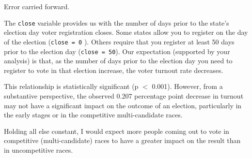 \documentclass[
  letterpaper,
  DIV=11,
  numbers=noendperiod]{scrartcl}
\begin{document}
\begin{tcolorbox}[enhanced jigsaw, titlerule=0mm, colframe=quarto-callout-note-color-frame, rightrule=.15mm, coltitle=black, leftrule=.75mm, breakable, colback=white, toprule=.15mm, left=2mm, bottomrule=.15mm, colbacktitle=quarto-callout-note-color!10!white, opacityback=0, arc=.35mm, bottomtitle=1mm, opacitybacktitle=0.6, title=\textcolor{quarto-callout-note-color}{\faInfo}\hspace{0.5em}{Note}, toptitle=1mm]

Error carried forward.

The \texttt{close} variable provides us with the number of days prior to
the state's election day voter registration closes. Some states allow
you to register on the day of the election (\texttt{close\ =\ 0} ).
Others require that you register at least 50 days prior to the election
day (\texttt{close\ =\ 50}). Our expectation (supported by your
analysis) is that, as the number of days prior to the election day you
need to register to vote in that election increase, the voter turnout
rate decreases.

\end{tcolorbox}

This relationship is statistically significant (p \(<\) 0.001). However,
from a substantive perspective, the observed 0.207 percentage point
decrease in turnout may not have a significant impact on the outcome of
an election, particularly in the early stages or in the competitive
multi-candidate races.

\begin{tcolorbox}[enhanced jigsaw, titlerule=0mm, colframe=quarto-callout-note-color-frame, rightrule=.15mm, coltitle=black, leftrule=.75mm, breakable, colback=white, toprule=.15mm, left=2mm, bottomrule=.15mm, colbacktitle=quarto-callout-note-color!10!white, opacityback=0, arc=.35mm, bottomtitle=1mm, opacitybacktitle=0.6, title=\textcolor{quarto-callout-note-color}{\faInfo}\hspace{0.5em}{Note}, toptitle=1mm]

Holding all else constant, I would expect more people coming out to vote
in competitive (multi-candidate) races to have a greater impact on the
result than in uncompetitive races.

\end{tcolorbox}
\end{document}
